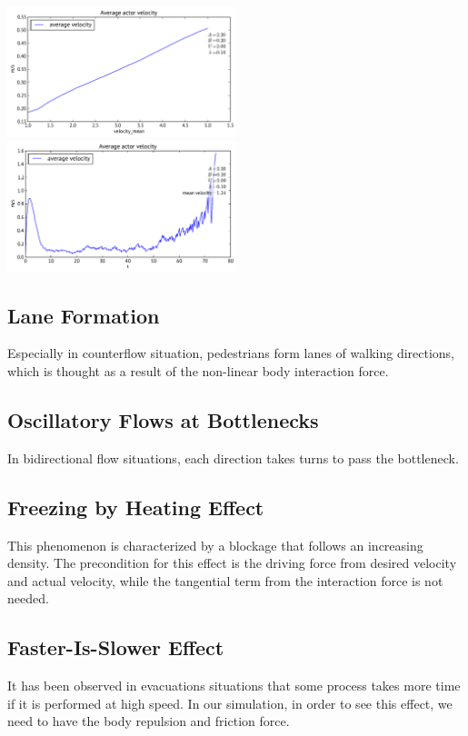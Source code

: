 \includegraphics[width=0.5\textwidth]{Figures/plots/square_room-velocity-aggr-velocity_mean.pdf}
\includegraphics[width=0.5\textwidth]{Figures/plots/square_room-velocity.pdf}

\subsection{Lane Formation}
Especially in counterflow situation, pedestrians form lanes of walking directions, which is thought as a result of the non-linear body interaction force.

\subsection{Oscillatory Flows at Bottlenecks}
In bidirectional flow situations, each direction takes turns to pass the bottleneck.

\subsection{Freezing by Heating Effect}
This phenomenon is characterized by a blockage that follows an increasing density. The precondition for this effect is the driving force from desired velocity and actual velocity, while the tangential term from the interaction force is not needed.

\subsection{Faster-Is-Slower Effect}
It has been observed in evacuations situations that some process takes more time if it is performed at high speed. In our simulation, in order to see this effect, we need to have the body repulsion and friction force.